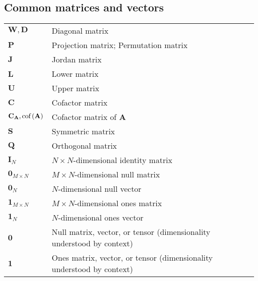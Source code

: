 \documentclass{article}
\newcommand{\cof}[1]{\ensuremath{\textnormal{cof}\left(#1\right)}} %
\begin{document}
\subsection{Common matrices and vectors}
\begin{xltabular}{\textwidth}{XX}
    \(\mathbf{W}, \mathbf{D}\) & Diagonal matrix \\
    \(\mathbf{P}\) & Projection matrix; Permutation matrix \\
    \(\mathbf{J}\) & Jordan matrix \\
    \(\mathbf{L}\) & Lower matrix\\
    \(\mathbf{U}\) & Upper matrix\\
    \(\mathbf{C}\) & Cofactor matrix\\
    \(\mathbf{C}_\mathbf{A}, \cof{\mathbf{A}}\) & Cofactor matrix of \(\mathbf{A}\)\\
    \(\mathbf{S}\) & Symmetric matrix\\
    \(\mathbf{Q}\) & Orthogonal matrix\\
    \(\mathbf{I}_N\) & \(N\times N\)-dimensional identity matrix\\
    \(\mathbf{0}_{M\times N}\) & \(M\times N\)-dimensional null matrix\\
    \(\mathbf{0}_{N}\) & \(N\)-dimensional null vector\\
    \(\mathbf{1}_{M\times N}\) & \(M\times N\)-dimensional ones matrix\\
    \(\mathbf{1}_{N}\) & \(N\)-dimensional ones vector\\
    \(\mathbf{0}\) & Null matrix, vector, or tensor (dimensionality understood by context)\\
    \(\mathbf{1}\) & Ones matrix, vector, or tensor (dimensionality understood by context)\\
\end{xltabular}
\end{document}
